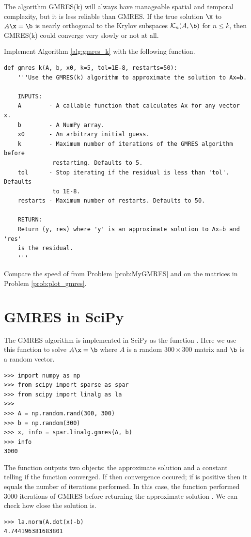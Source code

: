The algorithm GMRES(k) will always have manageable spatial and temporal complexity, but it is less reliable than GMRES.
If the true solution $\x$ to $A\x=\b$ is nearly orthogonal to the Krylov subspaces $\mathcal{K}_n(A, \b)$ for $n\leq k$, then GMRES(k) could converge very slowly or not at all.

\begin{problem}
Implement Algorithm \ref{alg:gmres_k} with the following function.
\begin{lstlisting}
def gmres_k(A, b, x0, k=5, tol=1E-8, restarts=50):
    '''Use the GMRES(k) algorithm to approximate the solution to Ax=b.

    INPUTS:
    A        - A callable function that calculates Ax for any vector x.
    b        - A NumPy array.
    x0       - An arbitrary initial guess.
    k        - Maximum number of iterations of the GMRES algorithm before
              restarting. Defaults to 5.
    tol      - Stop iterating if the residual is less than 'tol'. Defaults
              to 1E-8.
    restarts - Maximum number of restarts. Defaults to 50.

    RETURN:
    Return (y, res) where 'y' is an approximate solution to Ax=b and 'res'
    is the residual.
    '''
\end{lstlisting}

Compare the speed of  from Problem \ref{prob:MyGMRES} and  on the matrices in Problem \ref{prob:plot_gmres}.
\label{prob:GMRES3}
\end{problem}

\section*{GMRES in SciPy} %
The GMRES algorithm is implemented in SciPy as the function .
Here we use this function to solve $A\x=\b$ where $A$ is a random $300 \times 300$ matrix and $\b$ is a random vector.

\begin{lstlisting}
>>> import numpy as np
>>> from scipy import sparse as spar
>>> from scipy import linalg as la
>>>
>>> A = np.random.rand(300, 300)
>>> b = np.random(300)
>>> x, info = spar.linalg.gmres(A, b)
>>> info
3000
\end{lstlisting}

The function outputs two objects: the approximate solution  and a constant  telling if the function converged.
If  then convergence occured; if  is positive then it equals the number of iterations performed.
In this case, the function performed 3000 iterations of GMRES before returning the approximate solution .
We can check how close the solution is.
\begin{lstlisting}
>>> la.norm(A.dot(x)-b)
4.744196381683801
\end{lstlisting}

